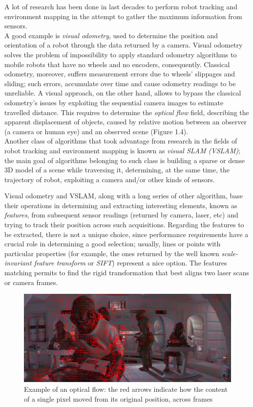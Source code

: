 \documentclass[a4paper, onecolumn]{report}
\begin{document}
A lot of research has been done in last decades to perform robot tracking and environment mapping in the attempt to gather the maximum information from sensors. \\
A good example is \emph{visual odometry}, used to determine the position and orientation of a robot through the data returned by a camera. Visual odometry solves the problem of impossibility to apply standard odometry algorithms to mobile robots that have no wheels and no encoders, consequently. Classical odometry, moreover, suffers measurement errors due to wheels' slippages and sliding; such errors, accumulate over time and cause odometry readings to be unreliable. A visual approach, on the other hand, allows to bypass the classical odometry's issues by exploiting the sequential camera images to estimate travelled distance. This requires to determine the \emph{optical flow} field, describing the apparent displacement of objects, caused by relative motion between an observer (a camera or human eye) and an observed scene (Figure 1.4). \\
Another class of algorithms that took advantage from research in the fields of robot tracking and environment mapping is known as \emph{visual SLAM (VSLAM)}; the main goal of algorithms belonging to such class is building a sparse or dense 3D model of a scene while traversing it, determining, at the same time, the trajectory of robot, exploiting a camera and/or other kinds of sensors. 

Visual odometry and VSLAM, along with a long series of other algorithm, base their operations in determining and extracting interesting elements, known as \emph{features}, from subsequent sensor readings (returned by camera, laser, etc) and trying to track their position across such acquisitions. Regarding the features to be extracted, there is not a unique choice, since performance requirements have a crucial role in determining a good selection; usually, lines or points with particular properties (for example, the ones returned by the well known \emph{scale-invariant feature transform} or \emph{SIFT}) represent a nice option.
The features matching permits to find the rigid transformation that best aligns two laser scans or camera frames.
\begin{figure}[htb]
\centering
\centering\setlength{\captionmargin}{0pt}%
\includegraphics[width=.90\textwidth]{images/optical_flow.png}
\caption{Example of an optical flow: the red arrows indicate how the content of a single pixel moved from its original position, across frames}
\end{figure}
\end{document}
